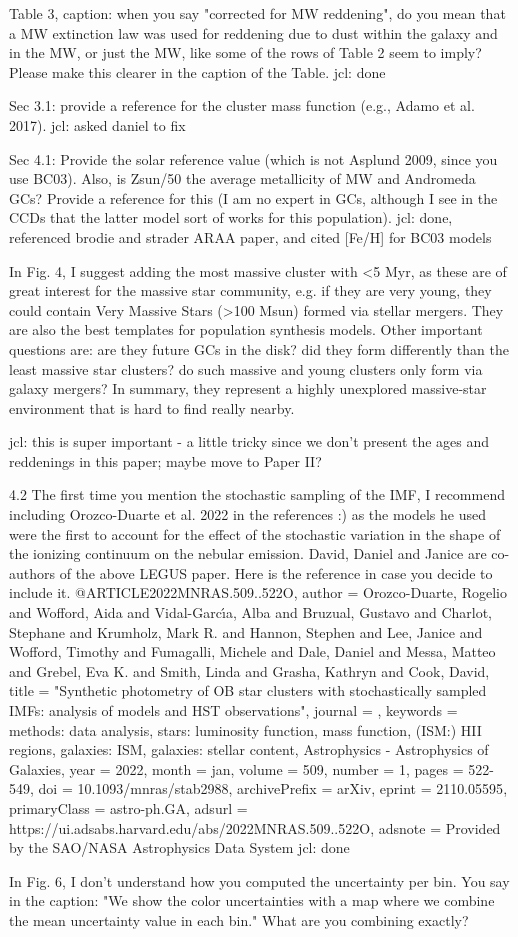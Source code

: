Table 3, caption: when you say "corrected for MW reddening", do you mean that a MW extinction law was used for reddening due to dust within the galaxy and in the MW, or just the MW, like some of the rows of Table 2 seem to imply? Please make this clearer in the caption of the Table.
jcl: done


Sec 3.1: provide a reference for the cluster mass function (e.g., Adamo et al. 2017). 
jcl: asked daniel to fix


Sec 4.1: Provide the solar reference value (which is not Asplund 2009, since you use BC03). Also, is  Zsun/50 the average metallicity of MW and Andromeda GCs? Provide a reference for this (I am no expert in GCs, although I see in the CCDs that the latter model sort of works for this population).
jcl: done, referenced brodie and strader ARAA paper, and cited [Fe/H] for BC03 models


In Fig. 4, I suggest adding the most massive cluster with <5 Myr, as these are of great interest for the massive star community, e.g. if they are very young, they could contain Very Massive Stars (>100 Msun) formed via stellar mergers. They are also the best templates for population synthesis models. Other important questions are: are they future GCs in the disk? did they form differently than the least massive star clusters? do such massive and young clusters only form via galaxy mergers? In summary, they represent a highly unexplored massive-star environment that is hard to find really nearby.

jcl: this is super important -  a little tricky since we don't present the ages and reddenings in this paper; maybe move to Paper II?


4.2 The first time you mention the stochastic sampling of the IMF, I recommend including Orozco-Duarte et al. 2022 in the references :)  as the models he used were the first to account for the effect of the stochastic variation in the shape of the ionizing continuum on the nebular emission. David, Daniel and Janice are co-authors of the above LEGUS paper. Here is the reference in case you decide to include it.
@ARTICLE{2022MNRAS.509..522O,
       author = {{Orozco-Duarte}, Rogelio and {Wofford}, Aida and {Vidal-Garc{\'\i}a}, Alba and {Bruzual}, Gustavo and {Charlot}, Stephane and {Krumholz}, Mark R. and {Hannon}, Stephen and {Lee}, Janice and {Wofford}, Timothy and {Fumagalli}, Michele and {Dale}, Daniel and {Messa}, Matteo and {Grebel}, Eva K. and {Smith}, Linda and {Grasha}, Kathryn and {Cook}, David},
        title = "{Synthetic photometry of OB star clusters with stochastically sampled IMFs: analysis of models and HST observations}",
      journal = {\mnras},
     keywords = {methods: data analysis, stars: luminosity function, mass function, (ISM:) HII regions, galaxies: ISM, galaxies: stellar content, Astrophysics - Astrophysics of Galaxies},
         year = 2022,
        month = jan,
       volume = {509},
       number = {1},
        pages = {522-549},
          doi = {10.1093/mnras/stab2988},
archivePrefix = {arXiv},
       eprint = {2110.05595},
 primaryClass = {astro-ph.GA},
       adsurl = {https://ui.adsabs.harvard.edu/abs/2022MNRAS.509..522O},
      adsnote = {Provided by the SAO/NASA Astrophysics Data System}
} 
jcl: done

In Fig. 6, I don't understand how you computed the uncertainty per bin. You say in the caption: "We show the color uncertainties with a map where we combine the mean uncertainty value in
each bin." What are you combining exactly?
